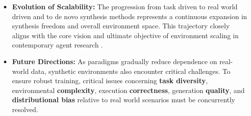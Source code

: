 \documentclass{llmxive}
\begin{document}
\begin{tcolorbox}[takeaway,title={Takeaway 5.1}]
\begin{itemize}
    \item \textbf{Evolution of Scalability:} The progression from task driven to real world driven and to de novo synthesis methods represents a continuous expansion in synthesis freedom and overall environment space. This trajectory closely aligns with the core vision and ultimate objective of environment scaling in contemporary agent research \cite{silver2025welcome}.
    
    \item \textbf{Future Directions:} As paradigms gradually reduce dependence on real-world data, synthetic environments also encounter critical challenges. To ensure robust training, critical issues concerning \textbf{task diversity}, environmental \textbf{complexity}, execution \textbf{correctness}, generation \textbf{quality}, and \textbf{distributional bias} relative to real world scenarios must be concurrently resolved.
\end{itemize}
\end{tcolorbox}
\end{document}
